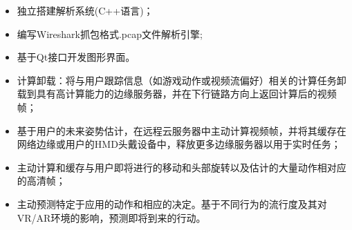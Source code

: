 \documentclass{resume}
\begin{document}
\begin{itemize}
  \item 独立搭建解析系统(C++语言)；
  \item 编写Wireshark抓包格式.pcap文件解析引擎;
  \item 基于Qt接口开发图形界面。
\end{itemize}


\begin{itemize}
  \item 计算卸载：将与用户跟踪信息（如游戏动作或视频流偏好）相关的计算任务卸载到具有高计算能力的边缘服务器，并在下行链路方向上返回计算后的视频帧；
  \item 基于用户的未来姿势估计，在远程云服务器中主动计算视频帧，并将其缓存在网络边缘或用户的HMD头戴设备中，释放更多边缘服务器以用于实时任务；
  \item 主动计算和缓存与用户即将进行的移动和头部旋转以及估计的大量动作相对应的高清帧；
  \item 主动预测特定于应用的动作和相应的决定。基于不同行为的流行度及其对VR/AR环境的影响，预测即将到来的行动。
\end{itemize}

\end{document}
